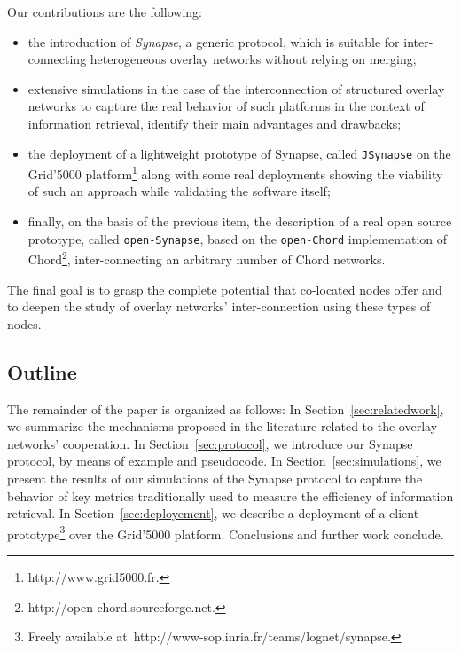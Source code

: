 Our contributions are the following:
%
\begin{itemize}
%
\item the introduction of \emph{Synapse}, a generic protocol, which is
  suitable for inter-connecting heterogeneous overlay networks without
  relying on merging;
%
\item extensive simulations in the case of the interconnection of
  structured overlay networks to capture the real behavior of such
  platforms in the context of information retrieval, identify their
  main advantages and drawbacks;

%
\item the deployment of a lightweight prototype of Synapse, called
  \texttt{JSynapse} on the Grid'5000 platform\footnote{{\sf
      http://www.grid5000.fr.}} along with some real deployments
  showing the viability of such an approach while validating the
  software itself;
%
\item finally, on the basis of the previous item, the description of a
  real open source prototype, called \texttt{open-Synapse}, based on
  the \texttt{open-Chord} implementation of Chord\footnote{{\sf
      http://open-chord.sourceforge.net.}}, inter-connecting an
  arbitrary number of Chord networks.

\end{itemize}
%
The final goal is to grasp the complete potential that co-located
nodes offer and to deepen the study of overlay networks'
inter-connection using these types of nodes.

\subsection{Outline}
The remainder of the paper is organized as follows: In
Section~\ref{sec:relatedwork}, we summarize the mechanisms proposed in
the literature related to the overlay networks' cooperation. In
Section~\ref{sec:protocol}, we introduce our Synapse protocol, by
means of example and pseudocode. In Section~\ref{sec:simulations}, we
present the results of our simulations of the Synapse protocol to
capture the behavior of key metrics traditionally used to measure the
efficiency of information retrieval. In Section~\ref{sec:deployement},
we describe a deployment of a client prototype\footnote{Freely
  available
  at~{\sf http://www-sop.inria.fr/teams/lognet/synapse}.} over the
Grid'5000 platform. Conclusions and further work conclude.



